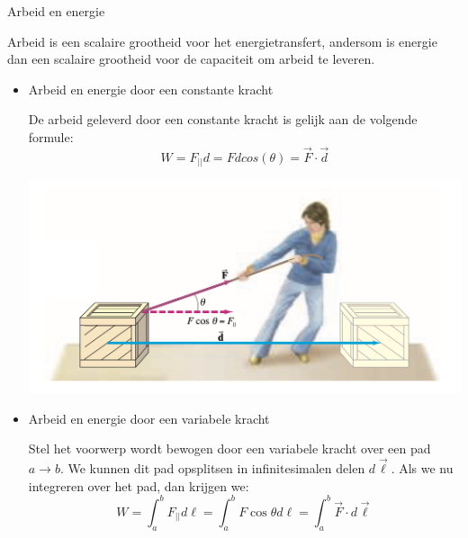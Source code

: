 \begin{theo}{Arbeid en energie}

    Arbeid is een scalaire grootheid voor het energietransfert, andersom is energie dan een scalaire grootheid voor de capaciteit om arbeid te leveren.

    \begin{itemize}
    
        \item{Arbeid en energie door een constante kracht}
        
            De arbeid geleverd door een constante kracht is gelijk aan de volgende formule:
            \begin{equation*}
                W = F_{||}d = Fdcos(\theta) = \Vec{F} \cdot \Vec{d}
            \end{equation*}
            \begin{center}
                \includegraphics[scale = 0.15]{Images/Dynamica/Arbeid bij constante kracht.png}
            \end{center}
        \item{Arbeid en energie door een variabele kracht}
        
            Stel het voorwerp wordt bewogen door een variabele kracht over een pad $ a \to b $. We kunnen dit pad opsplitsen in infinitesimalen delen $ d\Vec{\ell} $. Als we nu integreren over het pad, dan krijgen we: 
            \begin{equation*}
                W = \int_{a}^{b}  F_{||}d\ell = \int_{a}^{b} F \cos\theta d\ell = \int_{a}^{b} \Vec{F} \cdot d\Vec{\ell}
            \end{equation*}
    \end{itemize}
\end{theo}

